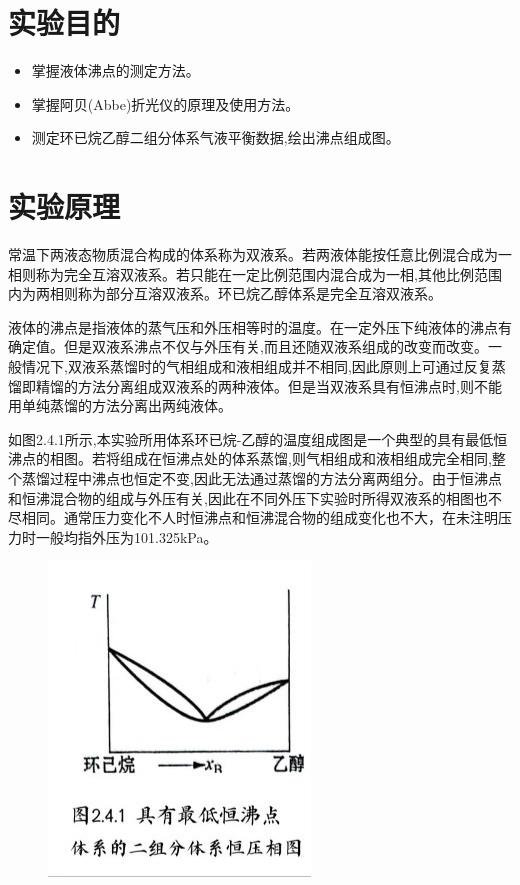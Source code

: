 \documentclass[12pt,hyperref,a4paper,UTF8]{ctexart}
\begin{document}
\cover

%
%

\thispagestyle{empty} %

\newpage
\tableofcontents

\newpage
\section{实验目的}
\begin{itemize}
    \item 掌握液体沸点的测定方法。
    \item 掌握阿贝(Abbe)折光仪的原理及使用方法。
    \item 测定环已烷乙醇二组分体系气液平衡数据,绘出沸点组成图。
\end{itemize}

\section{实验原理}
常温下两液态物质混合构成的体系称为双液系。若两液体能按任意比例混合成为一相则称为完全互溶双液系。若只能在一定比例范围内混合成为一相,其他比例范围内为两相则称为部分互溶双液系。环已烷乙醇体系是完全互溶双液系。

液体的沸点是指液体的蒸气压和外压相等时的温度。在一定外压下纯液体的沸点有确定值。但是双液系沸点不仅与外压有关,而且还随双液系组成的改变而改变。一般情况下,双液系蒸馏时的气相组成和液相组成并不相同,因此原则上可通过反复蒸馏即精馏的方法分离组成双液系的两种液体。但是当双液系具有恒沸点时,则不能用单纯蒸馏的方法分离出两纯液体。

如图2.4.1所示,本实验所用体系环已烷-乙醇的温度组成图是一个典型的具有最低恒沸点的相图。若将组成在恒沸点处的体系蒸馏,则气相组成和液相组成完全相同,整个蒸馏过程中沸点也恒定不变,因此无法通过蒸馏的方法分离两组分。由于恒沸点和恒沸混合物的组成与外压有关,因此在不同外压下实验时所得双液系的相图也不尽相同。通常压力变化不人时恒沸点和恒沸混合物的组成变化也不大，在未注明压力时一般均指外压为101.325kPa。
\begin{figure}[H]
    \centering
    \includegraphics[width=0.25\linewidth]{1.jpg}
    \label{fig:enter-label}
\end{figure}
\end{document}
